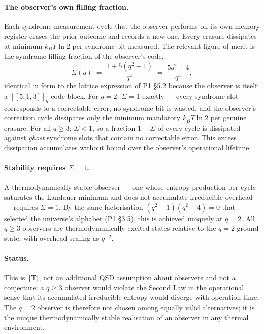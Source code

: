 \documentclass[11pt,a4paper]{article}
\newcommand{\Tmark}{\textcolor{orange!70!black}{\textbf{[T]}}}
\begin{document}
\paragraph{The observer's own filling fraction.}
Each syndrome-measurement cycle that the observer performs on its own memory register erases the prior outcome and records a new one. Every erasure dissipates at minimum $k_BT\ln 2$ per syndrome bit measured. The relevant figure of merit is the syndrome filling fraction of the observer's code,
\begin{equation}
  \Sigma(q) \;=\; \frac{1+5(q^2-1)}{q^4} \;=\; \frac{5q^2-4}{q^4},
  \label{eq:sigma_obs}
\end{equation}
identical in form to the lattice expression of P1 \S5.2 because the observer is itself a $[\![5,1,3]\!]_q$ code block. For $q=2$: $\Sigma=1$ exactly --- every syndrome slot corresponds to a correctable error, no syndrome bit is wasted, and the observer's correction cycle dissipates only the minimum mandatory $k_BT\ln 2$ per genuine erasure. For all $q\geq3$: $\Sigma<1$, so a fraction $1-\Sigma$ of every cycle is dissipated against \emph{ghost} syndrome slots that contain no correctable error. This excess dissipation accumulates without bound over the observer's operational lifetime.

\paragraph{Stability requires $\Sigma=1$.}
A thermodynamically stable observer --- one whose entropy production per cycle saturates the Landauer minimum and does not accumulate irreducible overhead --- requires $\Sigma=1$. By the same factorisation $(q^2-1)(q^2-4)=0$ that selected the universe's alphabet (P1 \S3.5), this is achieved uniquely at $q=2$. All $q\geq3$ observers are thermodynamically excited states relative to the $q=2$ ground state, with overhead scaling as $q^{-2}$.

\paragraph{Status.}
This is~\Tmark, not an additional QSD assumption about observers and not a conjecture: a $q\geq3$ observer would violate the Second Law in the operational sense that its accumulated irreducible entropy would diverge with operation time. The $q=2$ observer is therefore not chosen among equally valid alternatives; it is the unique thermodynamically stable realisation of an observer in any thermal environment.
\end{document}
